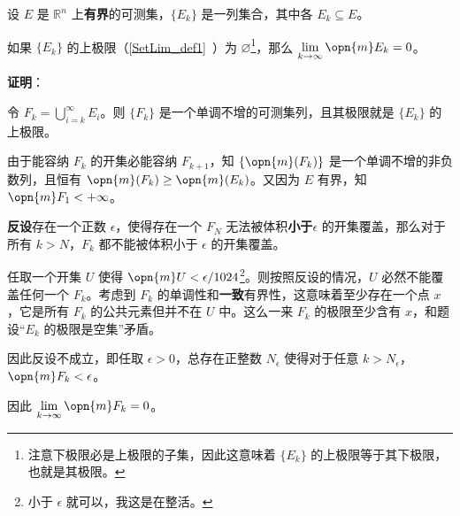 



\begin{lemma}{}\label{EgrfTh_lem1}
设 $E$ 是 $\mathbb{R}^n$ 上\textbf{有界}的可测集，$\{E_k\}$ 是一列集合，其中各 $E_k\subseteq E$。

如果 $\{E_k\}$ 的上极限（\autoref{SetLim_def1}~）为 $\varnothing$\footnote{注意下极限必是上极限的子集，因此这意味着 $\{E_k\}$ 的上极限等于其下极限，也就是其极限。}，那么 $\lim\limits_{k\to\infty}\opn{m}E_k=0$。
\end{lemma}

\textbf{证明}：

令 $F_k=\bigcup_{i=k}^\infty E_i$。则 $\{F_k\}$ 是一个单调不增的可测集列，且其极限就是 $\{E_k\}$ 的上极限。

由于能容纳 $F_k$ 的开集必能容纳 $F_{k+1}$，知 $\{\opn{m}(F_k)\}$ 是一个单调不增的非负数列，且恒有 $\opn{m}(F_k)\geq\opn{m}(E_k)$。又因为 $E$ 有界，知 $\opn{m}F_1<+\infty$。

\textbf{反设}存在一个正数 $\epsilon$，使得存在一个 $F_N$ 无法被体积\textbf{小于}$\epsilon$ 的开集覆盖，那么对于所有 $k>N$，$F_k$ 都不能被体积小于 $\epsilon$ 的开集覆盖。

任取一个开集 $U$ 使得 $\opn{m}U<\epsilon/1024$\footnote{小于 $\epsilon$ 就可以，我这是在整活。}。则按照反设的情况，$U$ 必然不能覆盖任何一个 $F_k$。考虑到 $F_k$ 的单调性和\textbf{一致}有界性，这意味着至少存在一个点 $x$，它是所有 $F_k$ 的公共元素但并不在 $U$ 中。这么一来 $F_k$ 的极限至少含有 $x$，和题设“$E_k$ 的极限是空集”矛盾。

因此反设不成立，即任取 $\epsilon>0$，总存在正整数 $N_\epsilon$ 使得对于任意 $k>N_\epsilon$，$\opn{m}F_k<\epsilon$。

因此 $\lim\limits_{k\to\infty}\opn{m}F_k=0$。

